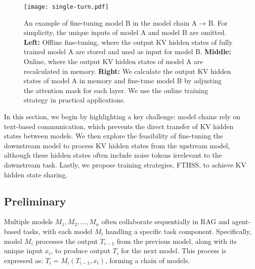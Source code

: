 



\begin{figure*}[t] 
\centerline{
\texttt{[image: single-turn.pdf]}} 
\caption{ 
An example of fine-tuning model B in the model chain A → B. For simplicity, the unique inputs of model A and model B are omitted. \textbf{Left:} Offline fine-tuning, where the output KV hidden states of fully trained model A are stored and used as input for model B. \textbf{Middle:} Online, where the output KV hidden states of model A are recalculated in memory. \textbf{Right:} We calculate the output KV hidden states of model A in memory and fine-tune model B by adjusting the attention mask for each layer. We use the online training strategy in practical applications.
} \label{fig:single-turn} 
\end{figure*}


In this section, 
we begin by highlighting a key challenge: model chains rely on text-based communication, which prevents the direct transfer of KV hidden states between models. We then explore the feasibility of fine-tuning the downstream model to process KV hidden states from the upstream model, although these hidden states often include noise tokens irrelevant to the downstream task.
Lastly, we propose training strategies, FTHSS, to achieve KV hidden state sharing. 



\subsection{Preliminary}
Multiple models $ M_1, M_2, \ldots, M_n $ often collaborate sequentially in RAG and agent-based tasks, with each model $ M_i $ handling a specific task component. Specifically, model $M_i$ processes the output $T_{i-1}$ from the previous model, along with its unique input $x_i$, to produce output $T_i$ for the next model. This process is expressed as: $T_i = M_i(T_{i-1}, x_i)$, forming a chain of models.

